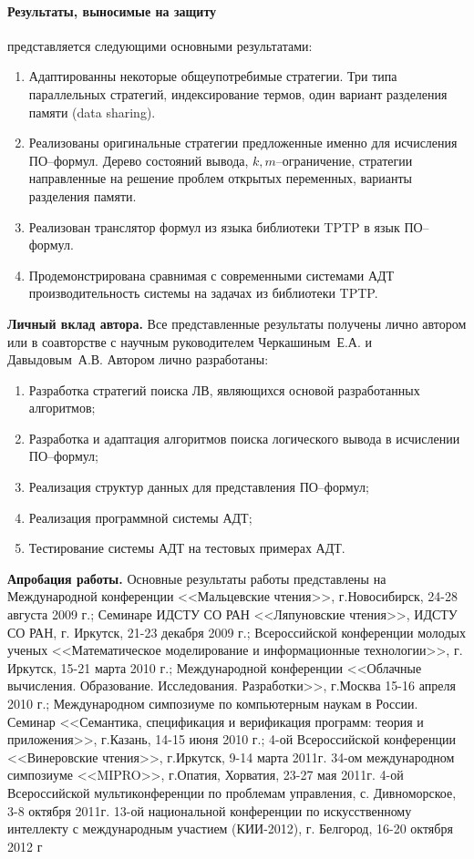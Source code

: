 \documentclass[a4paper]{report}
\begin{document}
\paragraph{Результаты, выносимые на защиту}\hspace{-1em} представляется следующими основными результатами:
\begin{enumerate}
\item Адаптированны некоторые общеупотребимые стратегии. Три типа параллельных стратегий, индексирование термов, один вариант разделения памяти (data sharing).
\item Реализованы оригинальные стратегии предложенные именно для исчисления ПО--формул. Дерево состояний вывода, $k,m$--ограничение, стратегии направленные на решение проблем открытых переменных, варианты разделения памяти.
\item Реализован транслятор формул из языка библиотеки TPTP в язык ПО--формул.
\item Продемонстрирована сравнимая с современными системами АДТ производительность системы на задачах из библиотеки TPTP.
\end{enumerate}

\textbf{Личный вклад автора.}
Все представленные результаты получены лично автором или в соавторстве с научным руководителем Черкашиным~Е.А. и Давыдовым~А.В. Автором лично разработаны:
\begin{enumerate}
\item Разработка стратегий поиска ЛВ, являющихся основой разработанных алгоритмов;
\item Разработка и адаптация алгоритмов поиска логического вывода в исчислении ПО--формул;
\item Реализация структур данных для представления ПО--формул;
\item Реализация программной системы АДТ;
\item Тестирование системы АДТ на тестовых примерах АДТ.
\end{enumerate}


\textbf{Апробация работы.}
Основные результаты работы представлены на Международной конференции <<Мальцевские чтения>>, г.Новосибирск, 24-28 августа 2009 г.;
Семинаре ИДСТУ СО РАН <<Ляпуновские чтения>>, ИДСТУ СО РАН, г. Иркутск, 21-23 декабря 2009 г.;
Всероссийской конференции молодых ученых <<Математическое моделирование и информационные технологии>>, г. Иркутск, 15-21 марта 2010 г.;
Международной конференции <<Облачные вычисления. Образование. Исследования. Разработки>>, г.Москва 15-16 апреля 2010 г.;
Международном симпозиуме по компьютерным наукам в России. Семинар <<Семантика, спецификация и верификация программ: теория и приложения>>, г.Казань, 14-15 июня 2010 г.;
4-ой Всероссийской конференции <<Винеровские чтения>>, г.Иркутск, 9-14 марта 2011г.
34-ом международном симпозиуме <<MIPRO>>, г.Опатия, Хорватия, 23-27 мая 2011г.
4-ой Всероссийской мультиконференции по проблемам управления, с. Дивноморское, 3-8 октября 2011г.
13-ой национальной конференции по искусственному интеллекту с международным участием (КИИ-2012), г. Белгород, 16-20 октября 2012 г
\end{document}
